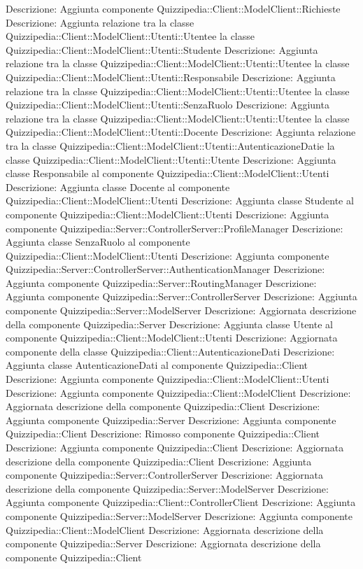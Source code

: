 Descrizione: Aggiunta componente Quizzipedia::Client::ModelClient::Richieste 
Descrizione: Aggiunta relazione tra la classe Quizzipedia::Client::ModelClient::Utenti::Utentee la classe Quizzipedia::Client::ModelClient::Utenti::Studente 
Descrizione: Aggiunta relazione tra la classe Quizzipedia::Client::ModelClient::Utenti::Utentee la classe Quizzipedia::Client::ModelClient::Utenti::Responsabile 
Descrizione: Aggiunta relazione tra la classe Quizzipedia::Client::ModelClient::Utenti::Utentee la classe Quizzipedia::Client::ModelClient::Utenti::SenzaRuolo 
Descrizione: Aggiunta relazione tra la classe Quizzipedia::Client::ModelClient::Utenti::Utentee la classe Quizzipedia::Client::ModelClient::Utenti::Docente 
Descrizione: Aggiunta relazione tra la classe Quizzipedia::Client::ModelClient::Utenti::AutenticazioneDatie la classe Quizzipedia::Client::ModelClient::Utenti::Utente 
Descrizione: Aggiunta classe Responsabile al componente Quizzipedia::Client::ModelClient::Utenti 
Descrizione: Aggiunta classe Docente al componente Quizzipedia::Client::ModelClient::Utenti 
Descrizione: Aggiunta classe Studente al componente Quizzipedia::Client::ModelClient::Utenti 
Descrizione: Aggiunta componente Quizzipedia::Server::ControllerServer::ProfileManager 
Descrizione: Aggiunta classe SenzaRuolo al componente Quizzipedia::Client::ModelClient::Utenti 
Descrizione: Aggiunta componente Quizzipedia::Server::ControllerServer::AuthenticationManager 
Descrizione: Aggiunta componente Quizzipedia::Server::RoutingManager 
Descrizione: Aggiunta componente Quizzipedia::Server::ControllerServer 
Descrizione: Aggiunta componente Quizzipedia::Server::ModelServer 
Descrizione: Aggiornata descrizione della componente Quizzipedia::Server 
Descrizione: Aggiunta classe Utente al componente Quizzipedia::Client::ModelClient::Utenti 
Descrizione: Aggiornata componente della classe Quizzipedia::Client::AutenticazioneDati 
Descrizione: Aggiunta classe AutenticazioneDati al componente Quizzipedia::Client 
Descrizione: Aggiunta componente Quizzipedia::Client::ModelClient::Utenti 
Descrizione: Aggiunta componente Quizzipedia::Client::ModelClient 
Descrizione: Aggiornata descrizione della componente Quizzipedia::Client 
Descrizione: Aggiunta componente Quizzipedia::Server 
Descrizione: Aggiunta componente Quizzipedia::Client 
Descrizione: Rimosso componente Quizzipedia::Client 
Descrizione: Aggiunta componente Quizzipedia::Client 
Descrizione: Aggiornata descrizione della componente Quizzipedia::Client 
Descrizione: Aggiunta componente Quizzipedia::Server::ControllerServer 
Descrizione: Aggiornata descrizione della componente Quizzipedia::Server::ModelServer 
Descrizione: Aggiunta componente Quizzipedia::Client::ControllerClient 
Descrizione: Aggiunta componente Quizzipedia::Server::ModelServer 
Descrizione: Aggiunta componente Quizzipedia::Client::ModelClient 
Descrizione: Aggiornata descrizione della componente Quizzipedia::Server 
Descrizione: Aggiornata descrizione della componente Quizzipedia::Client 
